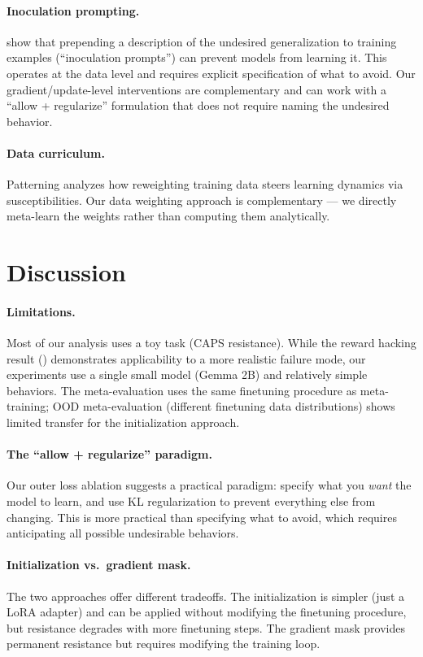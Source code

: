 \documentclass{article}
\begin{document}
\paragraph{Inoculation prompting.} \citet{chen2025inoculation} show that prepending a description of the undesired generalization to training examples (``inoculation prompts'') can prevent models from learning it. This operates at the data level and requires explicit specification of what to avoid. Our gradient/update-level interventions are complementary and can work with a ``allow + regularize'' formulation that does not require naming the undesired behavior.

\paragraph{Data curriculum.} Patterning \citep{chen2025patterning} analyzes how reweighting training data steers learning dynamics via susceptibilities. Our data weighting approach is complementary --- we directly meta-learn the weights rather than computing them analytically.

\section{Discussion}
\label{sec:discussion}

\paragraph{Limitations.} Most of our analysis uses a toy task (CAPS resistance). While the reward hacking result () demonstrates applicability to a more realistic failure mode, our experiments use a single small model (Gemma 2B) and relatively simple behaviors. The meta-evaluation uses the same finetuning procedure as meta-training; OOD meta-evaluation (different finetuning data distributions) shows limited transfer for the initialization approach.

\paragraph{The ``allow + regularize'' paradigm.} Our outer loss ablation suggests a practical paradigm: specify what you \emph{want} the model to learn, and use KL regularization to prevent everything else from changing. This is more practical than specifying what to avoid, which requires anticipating all possible undesirable behaviors.

\paragraph{Initialization vs.\ gradient mask.} The two approaches offer different tradeoffs. The initialization is simpler (just a LoRA adapter) and can be applied without modifying the finetuning procedure, but resistance degrades with more finetuning steps. The gradient mask provides permanent resistance but requires modifying the training loop.



\end{document}
